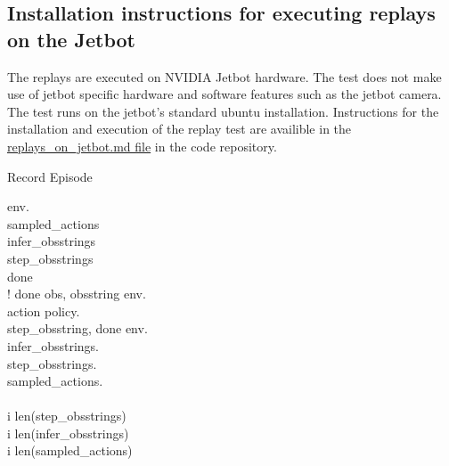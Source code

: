 \subsection{Installation instructions for executing replays on the Jetbot}

The replays are executed on NVIDIA Jetbot hardware. The test does not make use of jetbot specific hardware and software features such as the jetbot camera. The test runs on the jetbot's standard ubuntu installation. Instructions for the installation and execution of the replay test are availible in the \href{https://github.com/geschnee/carsim-rl-cnn/blob/main/replays_on_jetbot.md}{replays\_on\_jetbot.md file} in the code repository.


\renewcommand{\thepseudonum}{\roman{pseudonum}}
\begin{pseudocode}{Record Episode}{ }
    \\


    env.\\

    sampled\_actions \GETS [] \\
    infer\_obsstrings \GETS [] \\
    step\_obsstrings \GETS [] \\

    done \GETS \FALSE\\

    \WHILE ! done \DO
    \BEGIN
    obs, obsstring \GETS env.\\
    action \GETS policy.\\

    step\_obsstring, done \GETS env.\\

    infer\_obsstrings.\\
    step\_obsstrings.\\
    sampled\_actions.\\
    \END\\

    \FOR i  \TO len(step\_obsstrings) \DO
    \\
    \FOR i  \TO len(infer\_obsstrings) \DO
    \\
    \FOR i  \TO len(sampled\_actions) \DO
    \\


    \ENDPROCEDURE
    \label{pseudocode:record_episode}
\end{pseudocode}

